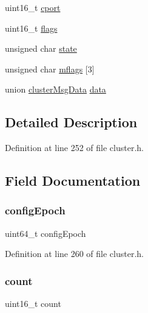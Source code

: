 \begin{DoxyCompactItemize}
uint16\+\_\+t \hyperlink{structcluster_msg_a6adf88a477cb0a9a34317bf4adbca458}{cport}
\item 
uint16\+\_\+t \hyperlink{structcluster_msg_a1e87af3c18a2fd36c61faf89949bdc3f}{flags}
\item 
unsigned char \hyperlink{structcluster_msg_ab12828525693568ae9c217805bea1ef9}{state}
\item 
unsigned char \hyperlink{structcluster_msg_a4b3606717108e723301f368f58e8ac55}{mflags} \mbox{[}3\mbox{]}
\item 
union \hyperlink{unioncluster_msg_data}{cluster\+Msg\+Data} \hyperlink{structcluster_msg_a1baf00312c0917b903606364f0a51211}{data}
\end{DoxyCompactItemize}


\subsection{Detailed Description}


Definition at line 252 of file cluster.\+h.



\subsection{Field Documentation}
\mbox{\label{structcluster_msg_a6bf0844859acadf5df37a7d49595680e}} 
\subsubsection{\texorpdfstring{config\+Epoch}{configEpoch}}
{\footnotesize\ttfamily uint64\+\_\+t config\+Epoch}



Definition at line 260 of file cluster.\+h.

\mbox{\label{structcluster_msg_af6a39bfc7e1dc3b6f9c997c1c43fa996}} 
\subsubsection{\texorpdfstring{count}{count}}
{\footnotesize\ttfamily uint16\+\_\+t count}



